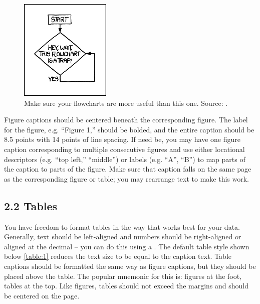 {{{{\begin{figure}[H]
  \centering
  \includegraphics[scale=0.7]{figs/example-image2}
  \caption{Make sure your flowcharts are more useful than this one. Source: .}
  \label{fig::2}
\end{figure}

Figure captions should be centered beneath the corresponding figure. The label for the figure, e.g. “Figure 1,” should be bolded, and the entire caption should be 8.5 points with 14 points of line spacing. If need be, you may have one figure caption corresponding to multiple consecutive figures and use either locational descriptors (e.g. “top left,” “middle”) or labels (e.g. “A”, “B”) to map parts of the caption to parts of the figure. Make sure that caption falls on the same page as the corresponding figure or table; you may rearrange text to make this work.

\subsection*{2.2 Tables}
You have freedom to format tables in the way that works best for your data. Generally, text should be left-aligned and numbers should be right-aligned or aligned at the decimal – you can do this using a . The default table style shown below \autoref{table:1} reduces the text size to be equal to the caption text.
Table captions should be formatted the same way as figure captions, but they should be placed above the table. The popular mnemonic for this is: figures at the foot, tables at the top. Like figures, tables should not exceed the margins and should be centered on the page.

}}}}
